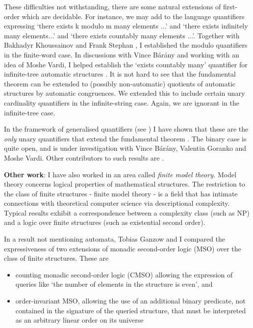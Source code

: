 \documentclass[12pt]{article}
\theoremstyle{plain} \numberwithin{equation}{section}
\theoremstyle{definition}
\begin{document}
These difficulties not withstanding, there are some natural extensions of first-order which are decidable. For instance, we may add to the language quantifiers expressing `there exists k modulo m many elements ...' and `there exists infinitely many elements...' and `there exists countably many elements ...'. Together with Bakhadyr Khoussainov and Frank Stephan \cite{KRS04}, I established the modulo quantifiers in the finite-word case. In discussions with Vince B{\'a}r{\'a}ny  and working with an idea of Moshe Vardi, I helped establish the `exists countably many' quantifier for infinite-tree automatic structures \cite{BKRa}. 
It is not hard to see that the fundamental theorem can be extended to (possibly non-automatic) quotients of automatic structures by automatic congruences. We extended this to include certain unary cardinality quantifiers \cite{BKRu08} in the infinite-string case. Again, we are ignorant in the infinite-tree case. 

In the framework of generalised quantifiers (see \cite{Hell89}) I have shown that these are the {\em only} unary quantifiers that extend the fundamental theorem \cite{Rubi08}. The binary case is quite open, and is under investigation with Vince B\'ar\'any, Valentin Goranko and Moshe Vardi. Other contributors to such results are \cite{Blum99, Colc04, KuLo05}.

\iffalse
{\bf Other work}: I have also worked in an area called {\em finite model theory.} Model theory concerns logical properties of mathematical structures. The restriction to the class of finite structures -  finite model theory -  is a field that has intimate connections with theoretical computer science via descriptional complexity. Typical results exhibit a correspondence between a complexity class (such as NP) and a logic over finite structures (such as existential second order).

In a result not mentioning automata, Tobias Ganzow and I compared the expressiveness of two extensions of monadic second-order logic (MSO) over the class of finite structures. These are

\begin{itemize}
\item counting monadic second-order logic (CMSO) allowing the expression of queries like `the number of elements in the structure is even', and
\item order-invariant MSO, allowing the use of an additional binary predicate, not contained in the signature of the queried structure, that must be interpreted as an arbitrary linear order on its universe
\end{itemize}
\end{document}
